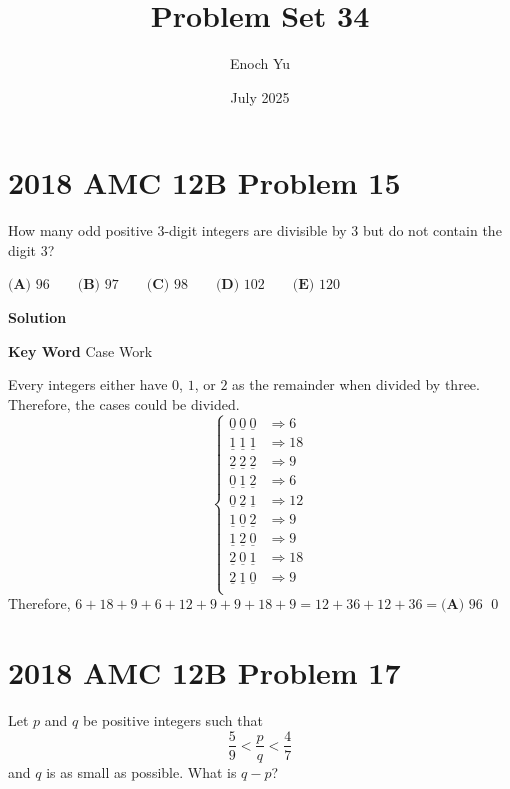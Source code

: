 \documentclass{article}
\title{Problem Set 34}
\author{Enoch Yu}
\date{July 2025}
\newenvironment{solution}{\begin{trivlist}\item[]{\bf Solution}}{\qed \end{trivlist}}
\begin{document}
\section*{2018 AMC 12B Problem 15}
How many odd positive $3$-digit integers are divisible by $3$ but do not contain the digit $3$?

$\textbf{(A) } 96 \qquad \textbf{(B) } 97 \qquad \textbf{(C) } 98 \qquad \textbf{(D) } 102 \qquad \textbf{(E) } 120$

\begin{solution}

\textbf{Key Word} Case Work

Every integers either have $0$, $1$, or $2$ as the remainder when divided by three. Therefore, the cases could be divided.
\[
\begin{cases}
    \underline{\boxed{0}}\ \underline{\boxed{0}}\ \underline{\boxed{0}} &\Rightarrow 6 \\
    \underline{\boxed{1}}\ \underline{\boxed{1}}\ \underline{\boxed{1}} &\Rightarrow 18 \\
    \underline{\boxed{2}}\ \underline{\boxed{2}}\ \underline{\boxed{2}} &\Rightarrow 9 \\
    \underline{\boxed{0}}\ \underline{\boxed{1}}\ \underline{\boxed{2}} &\Rightarrow 6 \\
    \underline{\boxed{0}}\ \underline{\boxed{2}}\ \underline{\boxed{1}} &\Rightarrow 12 \\
    \underline{\boxed{1}}\ \underline{\boxed{0}}\ \underline{\boxed{2}} &\Rightarrow 9 \\
    \underline{\boxed{1}}\ \underline{\boxed{2}}\ \underline{\boxed{0}} &\Rightarrow 9 \\
    \underline{\boxed{2}}\ \underline{\boxed{0}}\ \underline{\boxed{1}} &\Rightarrow 18 \\
    \underline{\boxed{2}}\ \underline{\boxed{1}}\ \underline{\boxed{0}} &\Rightarrow 9 \\
\end{cases}
\]
Therefore, $6 + 18 + 9 + 6 + 12 + 9 + 9 + 18 + 9 = 12 + 36 + 12 + 36 = \boxed{\textbf{(A) } 96}$
\end{solution}

\section*{2018 AMC 12B Problem 17}
Let $p$ and $q$ be positive integers such that\[\frac{5}{9} < \frac{p}{q} < \frac{4}{7}\]and $q$ is as small as possible. What is $q-p$?
\end{document}
